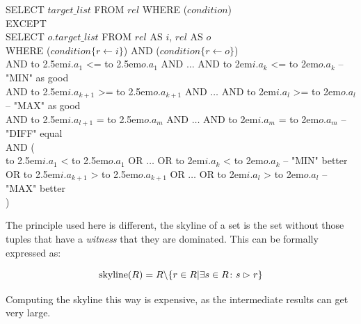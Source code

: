 \begin{sql}\label{sql:rewrite-with-except}
\newcommand\abox[1]{\hbox to 2.5em{#1\hfil}}%
\newcommand\bbox[1]{\hbox to 2em{#1\hfil}}%
SELECT $target\_list$ FROM $rel$ WHERE ($condition$) \\
EXCEPT \\
SELECT $o.target\_list$ FROM $rel$ AS $i$, $rel$ AS $o$\\
WHERE ($condition\{r \gets i\}$) AND ($condition\{r \gets o\}$)\\
AND \abox{$i.a_1$} <= \abox{$o.a_1$} AND $\ldots$ AND \bbox{$i.a_k$} <= \bbox{$o.a_k$} -- "MIN" as good\\
AND \abox{$i.a_{k+1}$} >= \abox{$o.a_{k+1}$} AND $\ldots$ AND \bbox{$i.a_l$} >= \bbox{$o.a_l$} -- "MAX" as good\\
AND \abox{$i.a_{l+1}$} { }= \abox{$o.a_m$} AND $\ldots$ AND \bbox{$i.a_m$} { }= \bbox{$o.a_m$} -- "DIFF" equal \\
AND (\\
\phantom{{ }{ }{ }}\abox{$i.a_1$} < \abox{$o.a_1$} OR $\ldots$ OR \bbox{$i.a_k$} < \bbox{$o.a_k$} -- "MIN" better \\
OR \abox{$i.a_{k+1}$} > \abox{$o.a_{k+1}$} OR $\ldots$ OR \bbox{$i.a_l$} > \bbox{$o.a_l$} -- "MAX" better \\
)
\end{sql}

\noindent
The principle used here is different, the skyline of a set is the set
without those tuples that have a \emph{witness} that
they are dominated. This can be formally expressed as:

\begin{equation}
\skyline(R) = R \backslash \{r \in R|\exists s \in R\colon s \dominates r\}
\end{equation}

Computing the skyline this way is expensive, as the intermediate
results can get very large.

